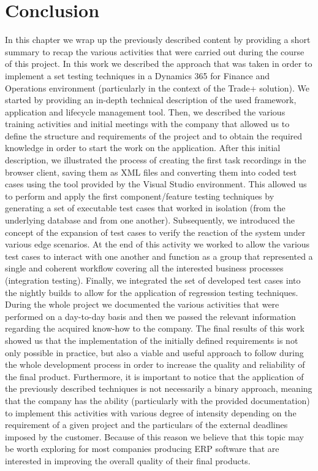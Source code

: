\chapter{Conclusion}

In this chapter we wrap up the previously described content by providing a short summary to recap the various activities that were carried out during the course of this project. 
In this work we described the approach that was taken in order to implement a set testing techniques in a Dynamics 365 for Finance and Operations environment (particularly in the context of the Trade+ solution). 
We started by providing an in-depth technical description of the used framework, application and lifecycle management tool. 
Then, we described the various training activities and initial meetings with the company that allowed us to define the structure and requirements of the project and to obtain the required knowledge in order to start the work on the application. 
After this initial description, we illustrated the process of creating the first task recordings in the browser client, saving them as XML files and converting them into coded test cases using the tool provided by the Visual Studio environment. 
This allowed us to perform and apply the first component/feature testing techniques by generating a set of executable test cases that worked in isolation (from the underlying database and from one another). 
Subsequently, we introduced the concept of the expansion of test cases to verify the reaction of the system under various edge scenarios. At the end of this activity we worked to allow the various test cases to interact with one another and function as a group that represented a single and coherent workflow covering all the interested business processes (integration testing).  
Finally, we integrated the set of developed test cases into the nightly builds to allow for the application of regression testing techniques. 
During the whole project we documented the various activities that were performed on a day-to-day basis and then we passed the relevant information regarding the acquired know-how to the company. 
The final results of this work showed us that the implementation of the initially defined requirements is not only possible in practice, but also a viable and useful approach to follow during the whole development process in order to increase the quality and reliability of the final product. 
Furthermore, it is important to notice that the application of the previously described techniques is not necessarily a binary approach, meaning that the company has the ability (particularly with the provided documentation) to implement this activities with various degree of intensity depending on the requirement of a given project and the particulars of the external deadlines imposed by the customer. 
Because of this reason we believe that this topic may be worth exploring for most companies producing ERP software that are interested in improving the overall quality of their final products.


